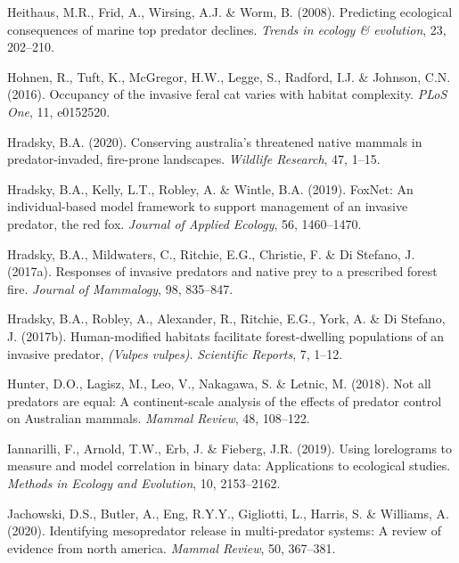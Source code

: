 \documentclass[11pt,a4paper,titlepage,twoside,openright]{style/unimelbthesis}
\begin{document}
\begin{mainmatter}
\leavevmode\hypertarget{ref-heithaus2008predicting}{}%
Heithaus, M.R., Frid, A., Wirsing, A.J. \& Worm, B. (2008). Predicting ecological consequences of marine top predator declines. \emph{Trends in ecology \& evolution}, 23, 202--210.

\leavevmode\hypertarget{ref-hohnen2016occupancy}{}%
Hohnen, R., Tuft, K., McGregor, H.W., Legge, S., Radford, I.J. \& Johnson, C.N. (2016). Occupancy of the invasive feral cat varies with habitat complexity. \emph{PLoS One}, 11, e0152520.

\leavevmode\hypertarget{ref-hradsky2020conserving}{}%
Hradsky, B.A. (2020). Conserving australia's threatened native mammals in predator-invaded, fire-prone landscapes. \emph{Wildlife Research}, 47, 1--15.

\leavevmode\hypertarget{ref-hradsky2019foxnet}{}%
Hradsky, B.A., Kelly, L.T., Robley, A. \& Wintle, B.A. (2019). FoxNet: An individual-based model framework to support management of an invasive predator, the red fox. \emph{Journal of Applied Ecology}, 56, 1460--1470.

\leavevmode\hypertarget{ref-hradsky2017responses}{}%
Hradsky, B.A., Mildwaters, C., Ritchie, E.G., Christie, F. \& Di Stefano, J. (2017a). Responses of invasive predators and native prey to a prescribed forest fire. \emph{Journal of Mammalogy}, 98, 835--847.

\leavevmode\hypertarget{ref-hradsky2017human}{}%
Hradsky, B.A., Robley, A., Alexander, R., Ritchie, E.G., York, A. \& Di Stefano, J. (2017b). Human-modified habitats facilitate forest-dwelling populations of an invasive predator, \emph{(Vulpes vulpes)}. \emph{Scientific Reports}, 7, 1--12.

\leavevmode\hypertarget{ref-hunter2018not}{}%
Hunter, D.O., Lagisz, M., Leo, V., Nakagawa, S. \& Letnic, M. (2018). Not all predators are equal: A continent-scale analysis of the effects of predator control on Australian mammals. \emph{Mammal Review}, 48, 108--122.

\leavevmode\hypertarget{ref-iannarilli2019lorelograms}{}%
Iannarilli, F., Arnold, T.W., Erb, J. \& Fieberg, J.R. (2019). Using lorelograms to measure and model correlation in binary data: Applications to ecological studies. \emph{Methods in Ecology and Evolution}, 10, 2153--2162.

\leavevmode\hypertarget{ref-jachowski2020identifying}{}%
Jachowski, D.S., Butler, A., Eng, R.Y.Y., Gigliotti, L., Harris, S. \& Williams, A. (2020). Identifying mesopredator release in multi-predator systems: A review of evidence from north america. \emph{Mammal Review}, 50, 367--381.


\end{mainmatter}
\end{document}
